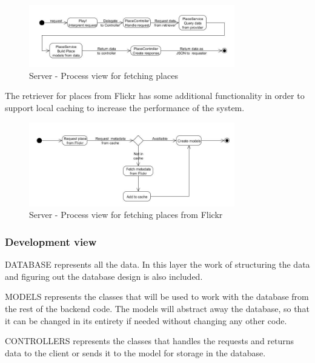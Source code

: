 \documentclass[11pt]{book}
\begin{document}
\begin{figure}[H]
      \centering
      \includegraphics[width=0.8\textwidth]{Figures/Architecture/serverProcessPlace.jpg}
      \caption{Server - Process view for fetching places}
      \label{fig:arch_server_process_place}
\end{figure}

The retriever for places from Flickr has some additional functionality in order to support local caching to increase the performance of the system.

\begin{figure}[H]
      \centering
      \includegraphics[width=0.8\textwidth]{Figures/Architecture/serverFlickrRetriever.jpg}
      \caption{Server - Process view for fetching places from Flickr}
      \label{fig:arch_server_process_flickr}
\end{figure}

\subsubsection{Development view}
DATABASE represents all the data. In this layer the work of structuring the data and figuring out the database design is also included.

MODELS represents the classes that will be used to work with the database from the rest of the backend code. The models will abstract away the database, so that it can be changed in its entirety if needed without changing any other code.

CONTROLLERS represents the classes that handles the requests and returns data to the client or sends it to the model for storage in the database.
\end{document}
